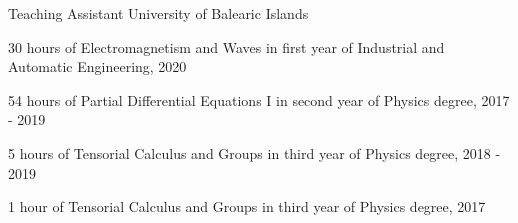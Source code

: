 \begin{cventries}
   \cventry
   {Teaching Assistant}
   {University of Balearic Islands}
   {}
   {}{
   \begin{cvitems}
        \item {30 hours of Electromagnetism and Waves in first year of Industrial and Automatic Engineering, 2020}
        \item{54 hours of Partial Differential Equations I in second year of Physics degree, 2017 - 2019}
        \item{5 hours of Tensorial Calculus and Groups in third year of Physics degree, 2018 - 2019}
        \item{1 hour of Tensorial Calculus and Groups in third year of Physics degree, 2017}
      \end{cvitems}
   }
\end{cventries}\vspace{-10pt}


